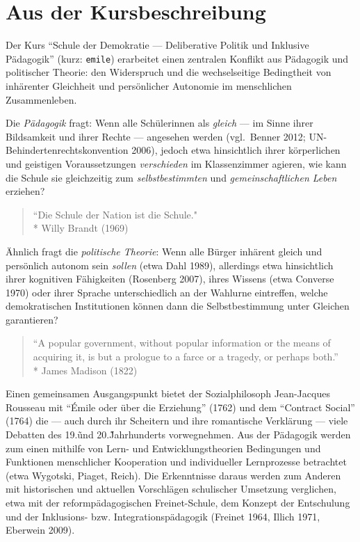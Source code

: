 \section[Kursbeschreibung]{Aus der Kursbeschreibung}

Der Kurs ``Schule der Demokratie --- Deliberative Politik und Inklusive Pädagogik'' (kurz: \lstinline{emile}) erarbeitet einen zentralen Konflikt aus Pädagogik und politischer Theorie:
den Widerspruch und die wechselseitige Bedingtheit von inhärenter Gleichheit und persönlicher Autonomie im menschlichen Zusammenleben.

Die \emph{Pädagogik} fragt:
Wenn alle Schülerinnen als \emph{gleich} --- im Sinne ihrer Bildsamkeit und ihrer Rechte --- angesehen werden (vgl.\ Benner 2012; UN-Behindertenrechtskonvention 2006),
jedoch etwa hinsichtlich ihrer körperlichen und geistigen Voraussetzungen \emph{verschieden} im Klassenzimmer agieren, wie kann die Schule sie gleichzeitig zum \emph{selbstbestimmten} und \emph{gemeinschaftlichen Leben} erziehen?

\begin{quote}
    ``Die Schule der Nation ist die Schule."\\*
    Willy Brandt (1969)
\end{quote}

Ähnlich fragt die \emph{politische Theorie}:
Wenn alle Bürger inhärent gleich und persönlich autonom sein \emph{sollen} (etwa Dahl 1989), allerdings etwa hinsichtlich ihrer kognitiven Fähigkeiten (Rosenberg 2007), ihres Wissens (etwa Converse 1970) oder ihrer Sprache unterschiedlich an der Wahlurne eintreffen, welche demokratischen Institutionen können dann die Selbstbestimmung unter Gleichen garantieren?

\begin{quote}
    ``A popular government, without popular information or the means of acquiring it, is but a prologue to a farce or a tragedy, or perhaps both.''\\*
    James Madison (1822)
\end{quote}

Einen gemeinsamen Ausgangspunkt bietet der Sozialphilosoph Jean-Jacques Rousseau mit ``Émile oder über die Erziehung'' (1762) und dem ``Contract Social'' (1764) die --- auch durch ihr Scheitern und ihre romantische Verklärung --- viele Debatten des 19.\~ und 20.\~ Jahrhunderts vorwegnehmen.
Aus der Pädagogik werden zum einen mithilfe von Lern- und Entwicklungstheorien Bedingungen und Funktionen menschlicher Kooperation und individueller Lernprozesse betrachtet (etwa Wygotski, Piaget, Reich).
Die Erkenntnisse daraus werden zum Anderen mit historischen und aktuellen Vorschlägen schulischer Umsetzung verglichen, etwa mit der reformpädagogischen Freinet-Schule, dem Konzept der Entschulung und der Inklusions- bzw. Integrationspädagogik (Freinet 1964, Illich 1971, Eberwein 2009).

